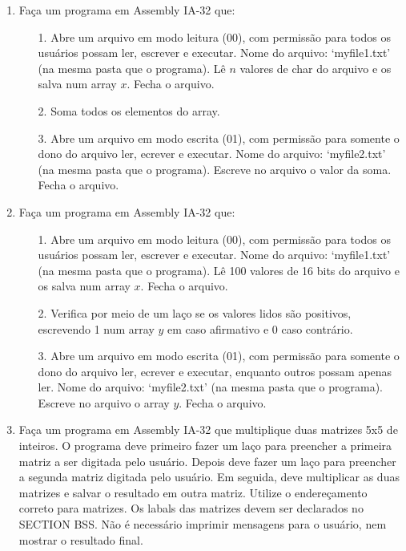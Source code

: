 \begin{enumerate}
    \item
    Faça um programa em Assembly IA-32 que:
    \begin{enumerate}
        \item [1.]
        Abre um arquivo em modo leitura (00), 
        com permissão para todos os usuários 
        possam ler, escrever e executar. 
        Nome do arquivo: `myfile1.txt' (na mesma pasta que o programa). 
        Lê $n$ valores de char do arquivo e os salva num array $x$. 
        Fecha o arquivo.

        \item [2.]
        Soma todos os elementos do array.

        \item [3.]
        Abre um arquivo em modo escrita (01), com permissão
        para somente o dono do arquivo ler, ecrever e executar. 
        Nome do arquivo: `myfile2.txt' (na mesma pasta que o programa). 
        Escreve no arquivo o valor da soma.
        Fecha o arquivo.
    \end{enumerate}

    \item
    Faça um programa em Assembly IA-32 que:
    \begin{enumerate}
        \item [1.]
        Abre um arquivo em modo leitura (00), 
        com permissão para todos os usuários 
        possam ler, escrever e executar. 
        Nome do arquivo: `myfile1.txt' (na mesma pasta que o programa). 
        Lê 100 valores de 16 bits do arquivo e os salva num array $x$. 
        Fecha o arquivo.

        \item [2.]
        Verifica por meio de um laço se os valores lidos são positivos,
        escrevendo 1 num array $y$ em caso afirmativo e 0 caso contrário.

        \item [3.]
        Abre um arquivo em modo escrita (01), com permissão
        para somente o dono do arquivo ler, ecrever e executar,
        enquanto outros possam apenas ler. 
        Nome do arquivo: `myfile2.txt' (na mesma pasta que o programa). 
        Escreve no arquivo o array $y$.
        Fecha o arquivo.
    \end{enumerate}

    \item
    Faça um programa em Assembly IA-32
    que multiplique duas matrizes 5x5 de inteiros.
    O programa deve primeiro fazer um laço 
    para preencher a primeira matriz a ser digitada pelo usuário.
    Depois deve fazer um laço 
    para preencher a segunda matriz digitada pelo usuário.
    Em seguida, deve multiplicar as duas matrizes
    e salvar o resultado em outra matriz.
    Utilize o endereçamento correto para matrizes.
    Os labals das matrizes devem ser declarados no SECTION BSS.
    Não é necessário imprimir mensagens para o usuário,
    nem mostrar o resultado final.


\end{enumerate}
